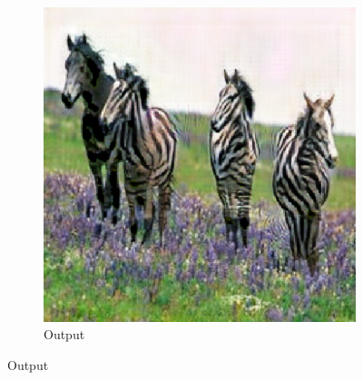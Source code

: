 \begin{figure}
\begin{subfigure}[t]{.14\textwidth}
  \end{subfigure}
  \begin{subfigure}[t]{.14\textwidth}
    \caption*{Output}
    \centering
    \includegraphics[width=\linewidth]{images/cycleGanResults/horse_output1.png}
  \end{subfigure}

  \medskip


\end{figure}
